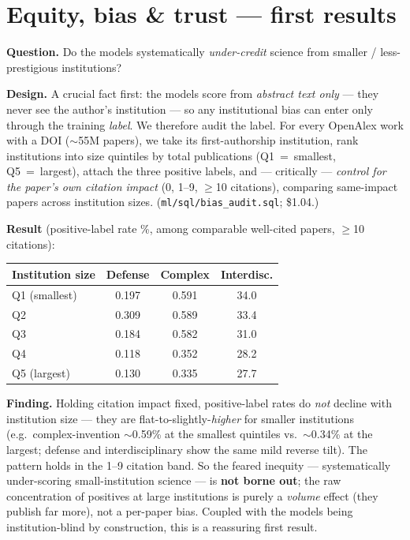 \documentclass[11pt]{article}
\begin{document}
\section{Equity, bias \& trust --- first results}\label{sec:bias}
\textbf{Question.} Do the models systematically \emph{under-credit} science from
smaller / less-prestigious institutions?

\textbf{Design.} A crucial fact first: the models score from \emph{abstract text
only} --- they never see the author's institution --- so any institutional bias can
enter only through the training \emph{label}. We therefore audit the label. For
every OpenAlex work with a DOI ($\sim$55M papers), we take its first-authorship
institution, rank institutions into size quintiles by total publications
(Q1~=~smallest, Q5~=~largest), attach the three positive labels, and --- critically
--- \emph{control for the paper's own citation impact} (0, 1--9, $\geq$10 citations),
comparing same-impact papers across institution sizes. (\texttt{ml/sql/bias\_audit.sql}; \$1.04.)

\textbf{Result} (positive-label rate \%, among comparable well-cited papers,
$\geq$10 citations):
\begin{center}
\begin{tabular}{@{}lccc@{}}
\toprule
\textbf{Institution size} & \textbf{Defense} & \textbf{Complex} & \textbf{Interdisc.} \\
\midrule
Q1 (smallest) & 0.197 & 0.591 & 34.0 \\
Q2            & 0.309 & 0.589 & 33.4 \\
Q3            & 0.184 & 0.582 & 31.0 \\
Q4            & 0.118 & 0.352 & 28.2 \\
Q5 (largest)  & 0.130 & 0.335 & 27.7 \\
\bottomrule
\end{tabular}
\end{center}

\textbf{Finding.} Holding citation impact fixed, positive-label rates do
\emph{not} decline with institution size --- they are flat-to-slightly-\emph{higher}
for smaller institutions (e.g.\ complex-invention $\sim$0.59\% at the smallest
quintiles vs.\ $\sim$0.34\% at the largest; defense and interdisciplinary show the
same mild reverse tilt). The pattern holds in the 1--9 citation band. So the feared
inequity --- systematically under-scoring small-institution science --- is
\textbf{not borne out}; the raw concentration of positives at large institutions is
purely a \emph{volume} effect (they publish far more), not a per-paper bias. Coupled
with the models being institution-blind by construction, this is a reassuring first
result.
\end{document}
